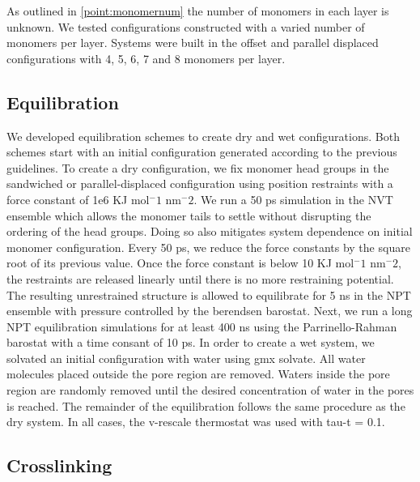 \documentclass{article}
\begin{document}
  As outlined in \ref{point:monomernum} the number of monomers in each layer is
  unknown. We tested configurations constructed with a varied number of
  monomers per layer. Systems were built in the offset and parallel displaced
  configurations with 4, 5, 6, 7 and 8 monomers per layer.

  \subsection*{Equilibration}

  We developed equilibration schemes to create dry and wet configurations. Both
  schemes start with an initial configuration generated according to the previous
  guidelines. To create a dry configuration, we fix monomer head groups in the
  sandwiched or parallel-displaced configuration using position restraints with a
  force constant of 1e6 KJ mol$^-1$ nm$^-2$. We run a 50 ps simulation in the
  NVT ensemble which allows the monomer tails to settle without disrupting the
  ordering of the head groups. Doing so also mitigates system dependence on
  initial monomer configuration. Every 50 ps, we reduce the force constants by
  the square root of its previous value. Once the force constant is below 10 KJ
  mol$^-1$ nm$^-2$, the restraints are released linearly until there is no more
  restraining potential. The resulting unrestrained structure is allowed to
  equilibrate for 5 ns in the NPT ensemble with pressure controlled by the
  berendsen barostat. Next, we run a long NPT equilibration simulations for at
  least 400 ns using the Parrinello-Rahman barostat with a time consant of 10 ps.
  In order to create a wet system, we solvated an initial configuration with
  water using gmx solvate. All water molecules placed outside the pore region are
  removed. Waters inside the pore region are randomly removed until the desired
  concentration of water in the pores is reached. The remainder of the
  equilibration follows the same procedure as the dry system. In all cases, the
  v-rescale thermostat was used with tau-t = 0.1. %

  \subsection*{Crosslinking}
\end{document}
